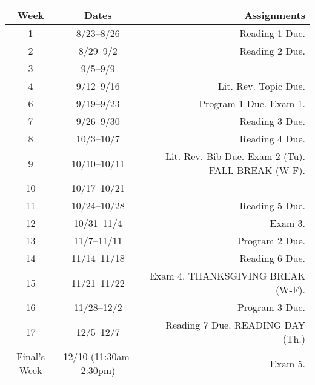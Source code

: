 \documentclass[10pt]{article}
\begin{document}
\begin{center}
\begin{tabular}{ccr}
\toprule
Week & Dates & Assignments \\
\toprule
1 & 8/23--8/26 & Reading 1 Due. \\
2 & 8/29--9/2 &  Reading 2 Due. \\
3 & 9/5--9/9 &   \\
4 & 9/12--9/16 &  Lit. Rev. Topic Due. \\
6 & 9/19--9/23 & Program 1 Due. Exam 1.\\
7 & 9/26--9/30  &  Reading 3 Due.\\
8 & 10/3--10/7 &  Reading 4 Due. \\
9 & 10/10--10/11 &  Lit. Rev. Bib Due. Exam 2 (Tu). FALL BREAK (W-F). \\
10 & 10/17--10/21 &  \\
11 & 10/24--10/28 &  Reading 5 Due.\\
12 & 10/31--11/4 &  Exam 3.\\
13 & 11/7--11/11 &  Program 2 Due. \\
14 & 11/14--11/18 & Reading 6 Due. \\
15 & 11/21--11/22 & Exam 4. THANKSGIVING BREAK (W-F).  \\
16 & 11/28--12/2 &   Program 3 Due. \\
17 & 12/5--12/7 & Reading 7 Due.  READING DAY (Th.) \\
\midrule
Final's Week & 12/10 (11:30am-2:30pm) & Exam 5. \\
\bottomrule
\end{tabular}
\end{center}
\end{document}
